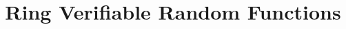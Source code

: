 \title[running  = {Ring Verifiable Random Functions},
      ]{Ring Verifiable Random Functions}



          
\date{ }




\maketitle


\begin{abstract}
  
\end{abstract}

